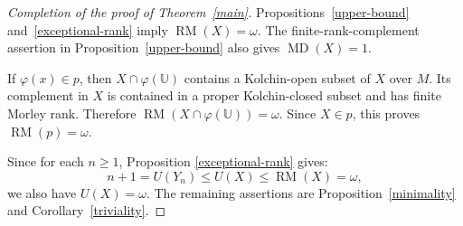 \documentclass[10pt,a4paper]{amsart}
\newcommand{\RM}{\operatorname{RM}}
\newcommand{\MD}{\operatorname{MD}}
\newcommand{\Ucal}{{\mathds{U}}}
\begin{document}
\begin{proof}[Completion of the proof of Theorem~\ref{main}]
Propositions~\ref{upper-bound} and~\ref{exceptional-rank} imply
$\RM(X)=\omega$. The finite-rank-complement assertion in
Proposition~\ref{upper-bound} also gives $\MD(X)=1$.

If $\varphi(x)\in p$, then $X\cap\varphi(\Ucal)$ contains a
Kolchin-open subset of $X$ over $M$. Its complement in $X$ is contained
in a proper Kolchin-closed subset and has finite Morley rank.
Therefore $\RM(X\cap\varphi(\Ucal))=\omega$. Since $X\in p$,
this proves $\RM(p)=\omega$.

Since for each $n\geqslant1$, Proposition \ref{exceptional-rank} gives:
\[
n+1=U(Y_n)\leqslant U(X)\leqslant\RM(X)=\omega,
\]
we also have $U(X)=\omega$. The remaining assertions are Proposition~\ref{minimality} and
Corollary~\ref{triviality}.
\end{proof}
\end{document}
